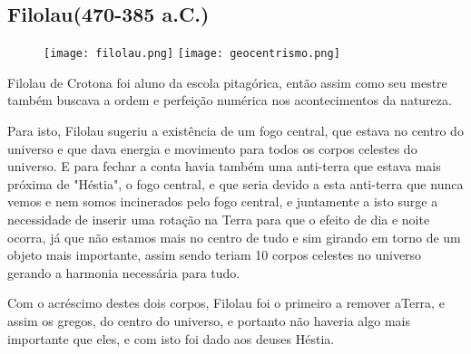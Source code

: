\subsection*{Filolau(470-385 a.C.)}
\begin{figure}[!htb]
	\centering
	\texttt{[image: filolau.png]}
	\texttt{[image: geocentrismo.png]}
\end{figure}

Filolau de Crotona foi aluno da escola pitagórica, então assim como seu mestre também buscava a ordem e perfeição numérica nos acontecimentos da natureza.

Para isto, Filolau sugeriu a existência de um fogo central, que estava no centro do universo e que dava energia e movimento para todos os corpos celestes do universo. E para fechar a conta havia também uma anti-terra que estava mais próxima de "Héstia", o fogo central, e que seria devido a esta anti-terra que nunca vemos e nem somos incinerados pelo fogo central, e juntamente a isto surge a necessidade de inserir uma rotação na Terra para que o efeito de dia e noite ocorra, já que não estamos mais no centro de tudo e sim girando em torno de um objeto mais importante, assim sendo teriam 10 corpos celestes no universo gerando a harmonia necessária para tudo.

Com o acréscimo destes dois corpos, Filolau foi o primeiro a remover aTerra, e assim os gregos, do centro do universo, e portanto não haveria algo mais importante que eles, e com isto foi dado aos deuses Héstia.







